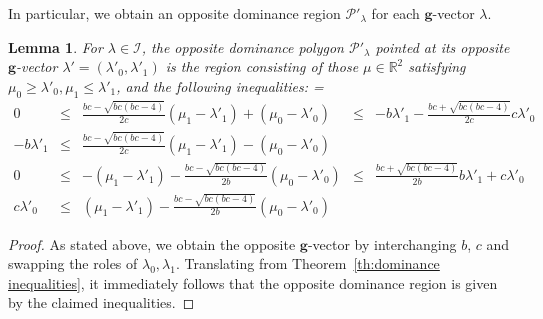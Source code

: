 \documentclass{amsart}
\newtheorem{lemma}[theorem]{Lemma}
\numberwithin{theorem}{section}
\newcommand{\bfg}{\boldsymbol{g}}
\newcommand{\cI}{\mathcal{I}}
\newcommand{\cP}{\mathcal{P}}
\newcommand{\RR}{\mathbb{R}}
\begin{document}
  In particular, we obtain an opposite dominance region $\cP'_\lambda$ for each $\bfg$-vector $\lambda$.
  \begin{lemma}
    For $\lambda\in\cI$, the opposite dominance polygon $\cP'_\lambda$ pointed at its opposite $\bfg$-vector $\lambda'=(\lambda'_0,\lambda'_1)$ is the region consisting of those $\mu\in\RR^2$ satisfying $\mu_0 \geq \lambda'_0, \mu_1 \leq\lambda'_1$, and the following inequalities:
    {
      \everymath={\displaystyle}
      \def\arraystretch{2.8}
      \[
        \begin{array}{rcccl}
          0 & \leq & \frac{b c-\sqrt{b c (b c-4)}}{2 c}(\mu_1-\lambda'_1)+(\mu_0-\lambda'_0) & \leq & -b\lambda'_1-\frac{b c+\sqrt{b c (b c-4)}}{2c}c\lambda'_0
          \\
          -b\lambda'_1 & \leq & \frac{b c-\sqrt{b c (b c-4)}}{2 c}(\mu_1-\lambda'_1)-(\mu_0-\lambda'_0)
          \\
          0 & \leq &  -(\mu_1-\lambda'_1)-\frac{b c-\sqrt{b c (b c-4)}}{2 b}(\mu_0-\lambda'_0) & \leq & \frac{b c+\sqrt{b c (b c-4)}}{2b}b\lambda'_1+c\lambda'_0
          \\
          c \lambda'_0 & \leq & (\mu_1-\lambda'_1) - \frac{b c-\sqrt{b c (b c-4)}}{2 b} (\mu_0-\lambda'_0)
        \end{array}
      \]
    }
  \end{lemma}
  \begin{proof}
    As stated above, we obtain the opposite $\bfg$-vector by interchanging $b$, $c$ and swapping the roles of $\lambda_0,\lambda_1$.
    Translating from Theorem~\ref{th:dominance inequalities}, it immediately follows that the opposite dominance region is given by the claimed inequalities.
  \end{proof}
\end{document}
